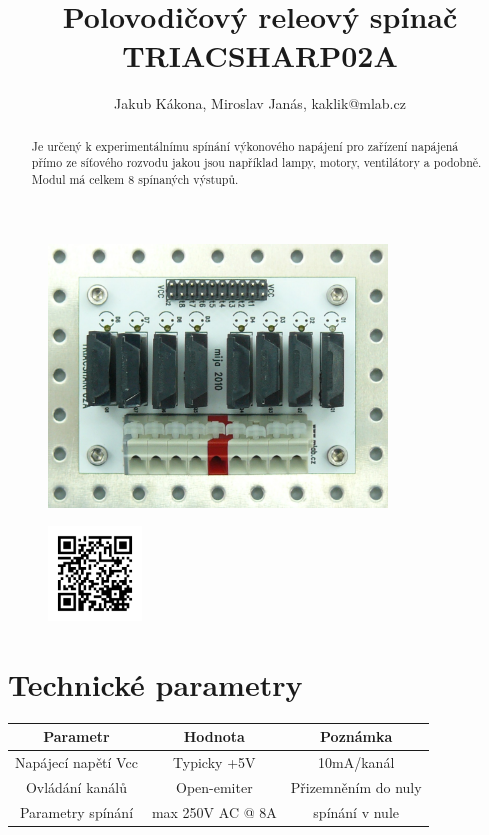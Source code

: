 \documentclass[12pt,a4paper,oneside]{article}
\begin{document}
\title{Polovodičový releový spínač TRIACSHARP02A}
\author{Jakub Kákona, Miroslav Janás,  kaklik@mlab.cz}
\maketitle

\thispagestyle{empty}
\begin{abstract}
Je určený k experimentálnímu spínání výkonového napájení pro zařízení napájená přímo ze síťového rozvodu jakou jsou například lampy, motory, ventilátory a podobně. Modul má celkem 8 spínaných výstupů.
\end{abstract}

\begin{figure} [htbp]
\begin{center}
\includegraphics [width=90mm] {./img/TRIACSHARP02A_Top_Big.jpg} 
\end{center}
\end{figure}

\begin{figure} [b]
\includegraphics [width=25mm] {./img/TRIACSHARP02A_QRcode.png} 
\end{figure}



\section{Technické parametry}
\begin{table}[htbp]
\begin{center}
\begin{tabular}{|c|c|c|}
\hline
\multicolumn{1}{|c|}{Parametr} & \multicolumn{1}{|c|}{Hodnota} & \multicolumn{1}{|c|}{Poznámka} \\ \hline
Napájecí napětí Vcc & Typicky +5V &  10mA/kanál \\ \hline
Ovládání kanálů  & Open-emiter & Přizemněním do nuly \\ \hline
Parametry spínání  & max 250V AC @ 8A &  spínání v nule \\ \hline
\end{tabular}
\end{center}
\end{table}
\end{document}
